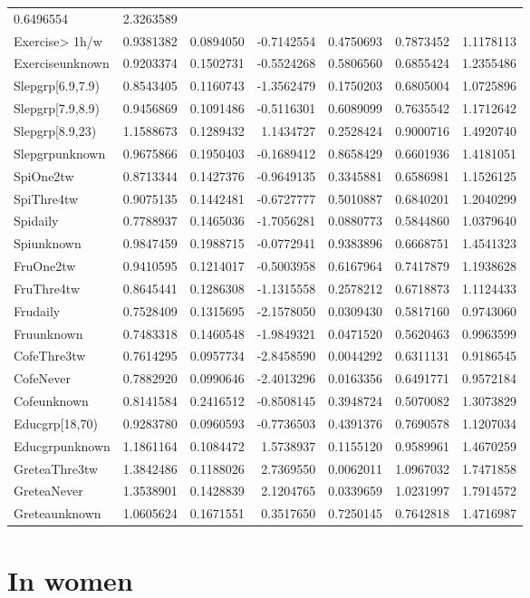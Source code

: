 \documentclass[]{article}
\begin{document}
\begin{longtable}[]{@{}lrrrrrr@{}}
0.6496554 & 2.3263589\tabularnewline
Exercise\textgreater{} 1h/w & 0.9381382 & 0.0894050 & -0.7142554 &
0.4750693 & 0.7873452 & 1.1178113\tabularnewline
Exerciseunknown & 0.9203374 & 0.1502731 & -0.5524268 & 0.5806560 &
0.6855424 & 1.2355486\tabularnewline
Slepgrp{[}6.9,7.9) & 0.8543405 & 0.1160743 & -1.3562479 & 0.1750203 &
0.6805004 & 1.0725896\tabularnewline
Slepgrp{[}7.9,8.9) & 0.9456869 & 0.1091486 & -0.5116301 & 0.6089099 &
0.7635542 & 1.1712642\tabularnewline
Slepgrp{[}8.9,23) & 1.1588673 & 0.1289432 & 1.1434727 & 0.2528424 &
0.9000716 & 1.4920740\tabularnewline
Slepgrpunknown & 0.9675866 & 0.1950403 & -0.1689412 & 0.8658429 &
0.6601936 & 1.4181051\tabularnewline
SpiOne2tw & 0.8713344 & 0.1427376 & -0.9649135 & 0.3345881 & 0.6586981 &
1.1526125\tabularnewline
SpiThre4tw & 0.9075135 & 0.1442481 & -0.6727777 & 0.5010887 & 0.6840201
& 1.2040299\tabularnewline
Spidaily & 0.7788937 & 0.1465036 & -1.7056281 & 0.0880773 & 0.5844860 &
1.0379640\tabularnewline
Spiunknown & 0.9847459 & 0.1988715 & -0.0772941 & 0.9383896 & 0.6668751
& 1.4541323\tabularnewline
FruOne2tw & 0.9410595 & 0.1214017 & -0.5003958 & 0.6167964 & 0.7417879 &
1.1938628\tabularnewline
FruThre4tw & 0.8645441 & 0.1286308 & -1.1315558 & 0.2578212 & 0.6718873
& 1.1124433\tabularnewline
Frudaily & 0.7528409 & 0.1315695 & -2.1578050 & 0.0309430 & 0.5817160 &
0.9743060\tabularnewline
Fruunknown & 0.7483318 & 0.1460548 & -1.9849321 & 0.0471520 & 0.5620463
& 0.9963599\tabularnewline
CofeThre3tw & 0.7614295 & 0.0957734 & -2.8458590 & 0.0044292 & 0.6311131
& 0.9186545\tabularnewline
CofeNever & 0.7882920 & 0.0990646 & -2.4013296 & 0.0163356 & 0.6491771 &
0.9572184\tabularnewline
Cofeunknown & 0.8141584 & 0.2416512 & -0.8508145 & 0.3948724 & 0.5070082
& 1.3073829\tabularnewline
Educgrp{[}18,70) & 0.9283780 & 0.0960593 & -0.7736503 & 0.4391376 &
0.7690578 & 1.1207034\tabularnewline
Educgrpunknown & 1.1861164 & 0.1084472 & 1.5738937 & 0.1155120 &
0.9589961 & 1.4670259\tabularnewline
GreteaThre3tw & 1.3842486 & 0.1188026 & 2.7369550 & 0.0062011 &
1.0967032 & 1.7471858\tabularnewline
GreteaNever & 1.3538901 & 0.1428839 & 2.1204765 & 0.0339659 & 1.0231997
& 1.7914572\tabularnewline
Greteaunknown & 1.0605624 & 0.1671551 & 0.3517650 & 0.7250145 &
0.7642818 & 1.4716987\tabularnewline
\bottomrule
\end{longtable}

\hypertarget{in-women-3}{%
\section{In women}\label{in-women-3}}
\end{document}
